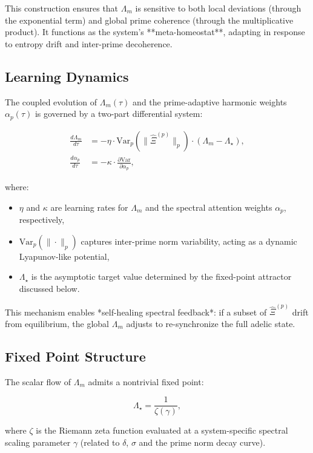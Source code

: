 \documentclass{article}
\theoremstyle{plain}
\theoremstyle{claimstyle}
\begin{document}
This construction ensures that $\Lambda_m$ is sensitive to both local deviations (through the exponential term) and global prime coherence (through the multiplicative product). It functions as the system’s **meta-homeostat**, adapting in response to entropy drift and inter-prime decoherence.

\subsection{Learning Dynamics}

The coupled evolution of $\Lambda_m(\tau)$ and the prime-adaptive harmonic weights $\alpha_p(\tau)$ is governed by a two-part differential system:

\begin{align}
\frac{d\Lambda_m}{d\tau} &= -\eta \cdot \text{Var}_p(\|\hat{\Xi}^{(p)}\|_p) \cdot (\Lambda_m - \Lambda_\star), \\
\frac{d\alpha_p}{d\tau} &= -\kappa \cdot \frac{\partial \text{Var}}{\partial \alpha_p},
\end{align}

where:
\begin{itemize}
    \item $\eta$ and $\kappa$ are learning rates for $\Lambda_m$ and the spectral attention weights $\alpha_p$, respectively,
    \item $\text{Var}_p(\|\cdot\|_p)$ captures inter-prime norm variability, acting as a dynamic Lyapunov-like potential,
    \item $\Lambda_\star$ is the asymptotic target value determined by the fixed-point attractor discussed below.
\end{itemize}

This mechanism enables *self-healing spectral feedback*: if a subset of $\hat{\Xi}^{(p)}$ drift from equilibrium, the global $\Lambda_m$ adjusts to re-synchronize the full adelic state.

\subsection{Fixed Point Structure}

The scalar flow of $\Lambda_m$ admits a nontrivial fixed point:

\begin{equation}
\Lambda_\star = \frac{1}{\zeta(\gamma)},
\end{equation}

where $\zeta$ is the Riemann zeta function evaluated at a system-specific spectral scaling parameter $\gamma$ (related to $\delta$, $\sigma$ and the prime norm decay curve).
\end{document}
